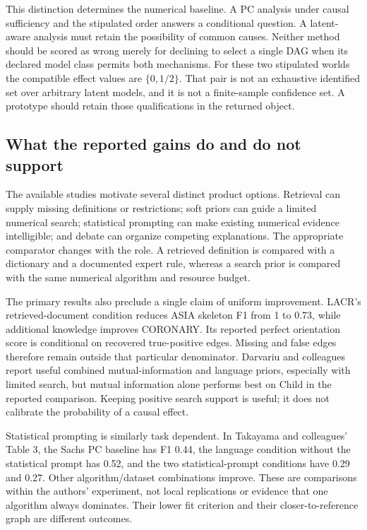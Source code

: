 This distinction determines the numerical baseline. A PC analysis under
causal sufficiency and the stipulated order answers a conditional
question. A latent-aware analysis must retain the possibility of common
causes. Neither method should be scored as wrong merely for declining to
select a single DAG when its declared model class permits both
mechanisms. For these two stipulated worlds the compatible effect values
are \(\{0,1/2\}\). That pair is not an exhaustive identified set over
arbitrary latent models, and it is not a finite-sample confidence set. A
prototype should retain those qualifications in the returned object.
\citep{exec14_iid_oracle}

\hypertarget{what-the-reported-gains-do-and-do-not-support}{%
\subsection{What the reported gains do and do not
support}\label{what-the-reported-gains-do-and-do-not-support}}

The available studies motivate several distinct product options.
Retrieval can supply missing definitions or restrictions; soft priors
can guide a limited numerical search; statistical prompting can make
existing numerical evidence intelligible; and debate can organize
competing explanations. The appropriate comparator changes with the
role. A retrieved definition is compared with a dictionary and a
documented expert rule, whereas a search prior is compared with the same
numerical algorithm and resource budget.

The primary results also preclude a single claim of uniform improvement.
LACR's retrieved-document condition reduces ASIA skeleton F1 from 1 to
0.73, while additional knowledge improves CORONARY. Its reported perfect
orientation score is conditional on recovered true-positive edges.
Missing and false edges therefore remain outside that particular
denominator. \citep{v12_la_2402_15301} Darvariu and colleagues report
useful combined mutual-information and language priors, especially with
limited search, but mutual information alone performs best on Child in
the reported comparison. Keeping positive search support is useful; it
does not calibrate the probability of a causal effect.
\citep{v12_la_2405_13551}

Statistical prompting is similarly task dependent. In Takayama and
colleagues' Table 3, the Sachs PC baseline has F1 0.44, the language
condition without the statistical prompt has 0.52, and the two
statistical-prompt conditions have 0.29 and 0.27. Other
algorithm/dataset combinations improve. These are comparisons within the
authors' experiment, not local replications or evidence that one
algorithm always dominates. Their lower fit criterion and their
closer-to-reference graph are different outcomes.
\citep{v12_la_2402_01454}

